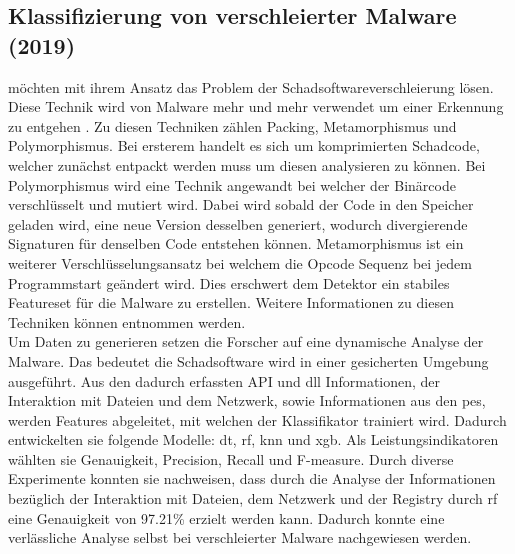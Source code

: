 \documentclass[
    12pt, %
    DIV10,
    ngerman, %
    a4paper, %
    oneside, %
    titlepage, %
    parskip=half, %
    headings=normal, %
    listof=totoc, %
    bibliography=totoc, %
    index=totoc, %
    captions=tableheading, %
    final %
]{scrreprt}
\begin{document}
\subsection{Klassifizierung von verschleierter Malware (2019)}
\textcite{Han2019} möchten mit ihrem Ansatz das Problem der Schadsoftwareverschleierung lösen. Diese Technik wird von Malware mehr und mehr verwendet um einer Erkennung zu entgehen \parencite{li2016facial}. Zu diesen Techniken zählen  Packing, Metamorphismus und Polymorphismus. Bei ersterem handelt es sich um komprimierten Schadcode, welcher zunächst entpackt werden muss um diesen analysieren zu können. Bei Polymorphismus wird eine Technik angewandt bei welcher der Binärcode verschlüsselt und mutiert wird. Dabei wird sobald der Code in den Speicher geladen wird, eine neue Version desselben generiert, wodurch divergierende Signaturen für denselben Code entstehen können. Metamorphismus ist ein weiterer Verschlüsselungsansatz bei welchem die Opcode Sequenz bei jedem Programmstart geändert wird. Dies erschwert dem Detektor ein stabiles Featureset für die Malware zu erstellen. Weitere Informationen zu diesen Techniken können \textcite{he2017model} entnommen werden.\\
Um Daten zu generieren setzen die Forscher auf eine dynamische Analyse der Malware. Das bedeutet die Schadsoftware wird in einer gesicherten Umgebung ausgeführt. Aus den dadurch erfassten API und \ac{dll} Informationen, der Interaktion mit Dateien und dem Netzwerk, sowie Informationen aus den \ac{pes}, werden Features abgeleitet, mit welchen der Klassifikator trainiert wird. Dadurch entwickelten sie folgende Modelle: \ac{dt}, \ac{rf}, \ac{knn} und \ac{xgb}. Als Leistungsindikatoren wählten sie Genauigkeit, Precision, Recall und F-measure. Durch diverse Experimente konnten sie nachweisen, dass durch die Analyse der Informationen bezüglich der Interaktion mit Dateien, dem Netzwerk und der Registry durch \ac{rf} eine Genauigkeit von 97.21\% erzielt werden kann. Dadurch konnte eine verlässliche Analyse selbst bei verschleierter Malware nachgewiesen werden. 

%
\end{document}
